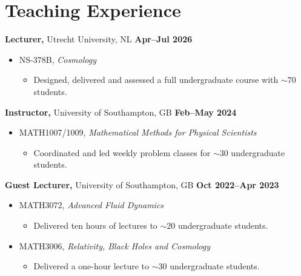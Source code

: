 \section{Teaching Experience}

\textbf{Lecturer,} Utrecht University, NL \hfill \textbf{Apr--Jul 2026}%
%
\vspace*{0.05in}
\begin{itemize}
    \item[] NS-378B, \textit{Cosmology}
    \begin{itemize}[nosep]
        \item[] Designed, delivered and assessed a full undergraduate course
        with $\sim 70$ students.
    \end{itemize}
\end{itemize}

\textbf{Instructor,} University of Southampton, GB
\hfill \textbf{Feb--May 2024}%
%
\vspace*{0.05in}
\begin{itemize}
    \item[] MATH1007/1009,
    \textit{Mathematical Methods for Physical Scientists}
    \begin{itemize}[nosep]
        \item[] Coordinated and led weekly problem classes for $\sim 30$
        undergraduate students.
    \end{itemize}
\end{itemize}

\textbf{Guest Lecturer,} University of Southampton, GB
\hfill \textbf{Oct 2022--Apr 2023}%
%
\vspace*{0.05in}
\begin{itemize}
    \item[] MATH3072, \textit{Advanced Fluid Dynamics}
    \begin{itemize}[nosep]
        \item[] Delivered ten hours of lectures to $\sim 20$ undergraduate
        students.
    \end{itemize}
    \item[] MATH3006, \textit{Relativity, Black Holes and Cosmology}
    \begin{itemize}[nosep]
        \item[] Delivered a one-hour lecture to $\sim 30$ undergraduate students.
    \end{itemize}
\end{itemize}

